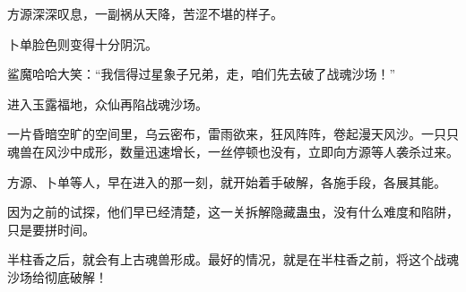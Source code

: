 \begin{this_body}
方源深深叹息，一副祸从天降，苦涩不堪的样子。

卜单脸色则变得十分阴沉。

鲨魔哈哈大笑：“我信得过星象子兄弟，走，咱们先去破了战魂沙场！”

进入玉露福地，众仙再陷战魂沙场。

一片昏暗空旷的空间里，乌云密布，雷雨欲来，狂风阵阵，卷起漫天风沙。一只只魂兽在风沙中成形，数量迅速增长，一丝停顿也没有，立即向方源等人袭杀过来。

方源、卜单等人，早在进入的那一刻，就开始着手破解，各施手段，各展其能。

因为之前的试探，他们早已经清楚，这一关拆解隐藏蛊虫，没有什么难度和陷阱，只是要拼时间。

半柱香之后，就会有上古魂兽形成。最好的情况，就是在半柱香之前，将这个战魂沙场给彻底破解！

\end{this_body}

